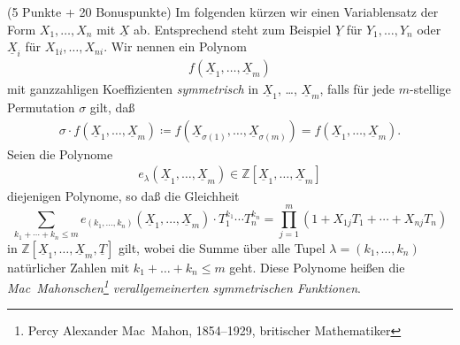 \documentclass[a4paper,10pt]{algsheet}
\begin{document}
\begin{exercise}(5 Punkte + 20 Bonuspunkte)\newline
    Im folgenden kürzen wir einen Variablensatz der Form \(X_1, \dotsc, X_n\)
    mit \(\underline X\) ab. Entsprechend steht zum Beispiel
    \(\underline Y\) für \(Y_1, \dotsc, Y_n\) oder \(\underline X_i\) für
    \(X_{1i}, \dotsc, X_{ni}\). 
    Wir nennen ein Polynom
    \begin{align*}
        f(\underline X_1, \dotsc, \underline X_m)
    \end{align*}
    mit ganzzahligen Koeffizienten
    \emph{symmetrisch} in \(\underline X_1\), \dots, \(\underline X_m\), falls für
    jede
    \(m\)-stellige Permutation \(\sigma\) gilt, daß
    \begin{align*}
        \sigma \cdot f(\underline X_1, \dotsc, \underline X_m)
        \coloneqq f(\underline X_{\sigma(1)}, \dotsc, \underline X_{\sigma(m)})
        = f(\underline X_1, \dotsc, \underline X_m).
    \end{align*}
    Seien die Polynome
    \begin{align*}
        e_\lambda(\underline X_1, \dotsc, \underline X_m) \in \mathbb Z[\underline X_1,
        \dotsc, \underline X_m]
    \end{align*}
    diejenigen Polynome, so daß die Gleichheit
    \begin{equation}
        \sum_{k_1 + \dotsb + k_n \leq m} 
        e_{(k_1, \dotsc, k_n)}(\underline X_1, \dotsc, \underline X_m) \cdot T_1^{k_1}
        \dotsm T_n^{k_n} = \prod_{j = 1}^m (1 + X_{1j} T_1 + \dotsb + X_{nj} T_n)
    \end{equation}
    in \(\mathbb     Z[\underline X_1, \dotsc, \underline X_m, \underline T]\) gilt,
    wobei die Summe über alle Tupel \(\lambda = (k_1, \dotsc, k_n)\)
    natürlicher Zahlen mit \(k_1 + \dotsc + k_n \leq m\) geht.  Diese Polynome
    heißen die \emph{Mac~Mahonschen\footnote{Percy Alexander Mac~Mahon, 1854--1929,
    britischer Mathematiker} verallgemeinerten symmetrischen Funktionen}.


\end{exercise}
\end{document}
